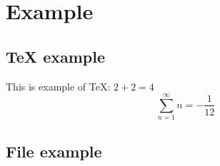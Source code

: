 \chapter{Example}

\section{TeX example}
	This is example of TeX: $2 + 2 = 4$
	\[ \sum_{n=1}^{\infty} n = -\frac{1}{12} \]

\section{File example}
